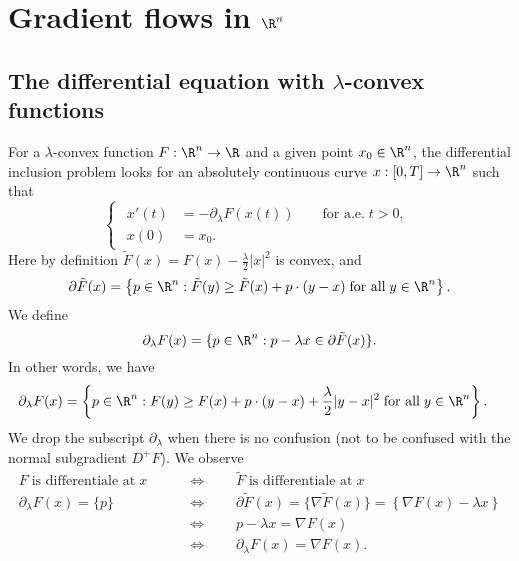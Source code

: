 \section{Gradient flows in $\R^n$}
\subsection{The differential equation with $\lambda$-convex functions}
For a $\lambda$-convex function $F:\R^n\to \R$ and a given point $x_0\in \R^n$, the differential inclusion problem looks for an absolutely continuous curve $x:[0,T]\to \R^n$ such that
\begin{equation}\label{eq:diff_inclusion}
    \begin{cases}
    \begin{aligned}
        x'(t) &= -\partial_\lambda F(x(t)) \qquad \text{for a.e.}\;t > 0,\\
        x(0)  &= x_0.
    \end{aligned}
    \end{cases}
\end{equation}
Here by definition $\tilde{F}(x) = F(x) - \frac{\lambda}{2}|x|^2$ is convex, and 
\begin{equation*}
    \partial \tilde{F}(x) = \left\lbrace  p\in \R^n: \tilde{F}(y) \geq \tilde{F}(x) + p\cdot (y-x)\;\text{for all}\;y\in \R^n\right\rbrace.
\end{equation*}
We define 
\begin{equation*}
    \partial_\lambda F(x)= \{p\in \R^n: p-\lambda x \in \partial \tilde{F}(x)\}.
\end{equation*}
In other words, we have
\begin{equation*}
\begin{aligned}
    \partial_\lambda F(x) &= \left\lbrace  p\in \R^n: F(y) \geq F(x) + p\cdot (y-x) + \frac{\lambda}{2}|y-x|^2\;\text{for all}\;y\in \R^n\right\rbrace.
    \end{aligned}
\end{equation*}
We drop the subscript $\partial_\lambda$ when there is no confusion (not to be confused with the normal subgradient $D^+F$). We observe
\begin{align*}
    F\;\text{is differentiale at}\;x &\qquad\Longleftrightarrow\qquad \tilde{F}\;\text{is differentiale at}\;x\\
     \partial _\lambda F(x) = \{p\} &\qquad\Longleftrightarrow\qquad   \partial\tilde{F}(x) = \{\nabla \tilde{F}(x)\} = \left\lbrace \nabla F(x) - \lambda x \right\rbrace\\
     &\qquad\Longleftrightarrow\qquad  p - \lambda x = \nabla F(x)\\
     &\qquad\Longleftrightarrow\qquad  \partial_\lambda F(x) = \nabla F(x).
\end{align*}

